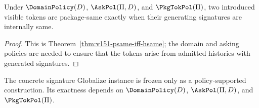 \begin{theorem}
\label{thm:v151-globalize-exact}
Under \(\DomainPolicy(D)\), \(\AskPol(\Pi,D)\), and \(\PkgTokPol(\Pi)\), two introduced visible tokens are package-same exactly when their generating signatures are internally same.
\end{theorem}

\begin{proof}
This is Theorem~\ref{thm:v151-psame-iff-hsame}; the domain and asking policies are needed to ensure that the tokens arise from admitted histories with generated signatures.
\end{proof}

\begin{corollary}
The concrete signature Globalize instance is frozen only as a policy-supported construction. Its exactness depends on \(\DomainPolicy(D)\), \(\AskPol(\Pi,D)\), and \(\PkgTokPol(\Pi)\).
\end{corollary}
